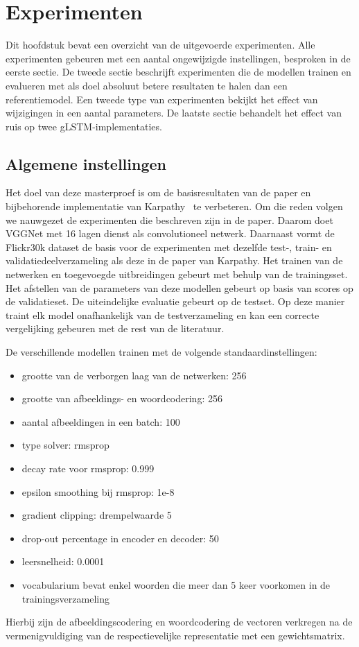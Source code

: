 \chapter{Experimenten} %
\label{cha:experimenten}
Dit hoofdstuk bevat een overzicht van de uitgevoerde experimenten. Alle experimenten gebeuren met een aantal ongewijzigde instellingen, besproken in de eerste sectie. De tweede sectie beschrijft experimenten die de modellen trainen en evalueren met als doel absoluut betere resultaten te halen dan een referentiemodel. Een tweede type van experimenten bekijkt het effect van wijzigingen in een aantal parameters. De laatste sectie behandelt het effect van ruis op twee gLSTM-implementaties.

\section{Algemene instellingen} %
\label{sec:eigen_implementaties_exp}
Het doel van deze masterproef is om de basisresultaten van de paper en bijbehorende implementatie van Karpathy~\cite{Karpathy2015} te verbeteren. Om die reden volgen we nauwgezet de experimenten die beschreven zijn in de paper. Daarom doet VGGNet met 16 lagen dienst als convolutioneel netwerk. Daarnaast vormt de Flickr30k dataset de basis voor de experimenten met dezelfde test-, train- en validatiedeelverzameling als deze in de paper van Karpathy. Het trainen van de netwerken en toegevoegde uitbreidingen gebeurt met behulp van de trainingsset. Het afstellen van de parameters van deze modellen gebeurt op basis van scores op de validatieset. De uiteindelijke evaluatie gebeurt op de testset. Op deze manier traint elk model onafhankelijk van de testverzameling en kan een correcte vergelijking gebeuren met de rest van de literatuur.

De verschillende modellen trainen met de volgende standaardinstellingen: 
\begin{itemize}
	\item grootte van de verborgen laag van de netwerken: 256
	\item grootte van afbeeldings- en woordcodering: 256
	\item aantal afbeeldingen in een batch: 100
	\item type solver: rmsprop
	\item decay rate voor rmsprop: 0.999
	\item epsilon smoothing bij rmsprop: 1e-8
	\item gradient clipping: drempelwaarde 5
	\item drop-out percentage in encoder en decoder: 50
	\item leersnelheid: 0.0001
	\item vocabularium bevat enkel woorden die meer dan 5 keer voorkomen in de trainingsverzameling
\end{itemize}Hierbij zijn de afbeeldingscodering en woordcodering de vectoren verkregen na de vermenigvuldiging van de respectievelijke representatie met een gewichtsmatrix.

